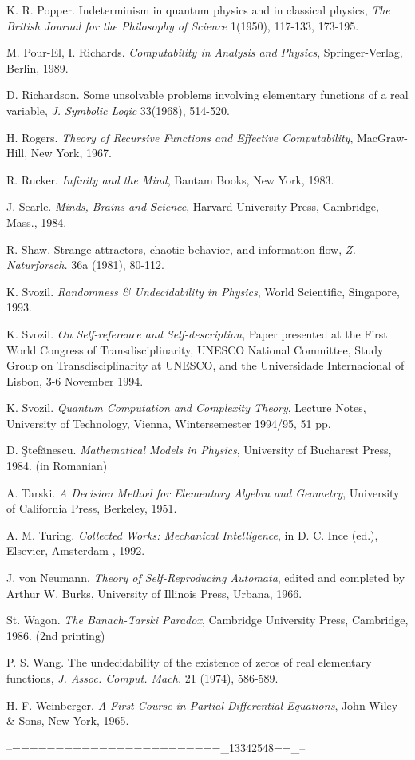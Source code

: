 \begin{thebibliography}{99999}
 K. R. Popper. Indeterminism in quantum physics and in classical
physics,
{\it The British Journal for the Philosophy of Science}
 1(1950), 117-133, 173-195.


 M. Pour-El, I. Richards. {\em
Computability in Analysis and Physics},
 Springer-Verlag, Berlin,  1989.

 D. Richardson. Some unsolvable problems involving
elementary functions
of a real variable, {\it J. Symbolic Logic} 33(1968), 514-520.

H. Rogers. {\it Theory of Recursive Functions and Effective
Computability}, MacGraw-Hill, New York, 1967.


R. Rucker. {\em Infinity and the Mind}, Bantam Books, New
York,  1983.


 J. Searle. {\it Minds, Brains and Science}, Harvard
University Press, Cambridge,
Mass., 1984.

  R. Shaw.  Strange attractors, chaotic behavior, and information
flow,
{\it Z. Naturforsch.}
36a
(1981),
80-112.


K. Svozil.  {\em Randomness \& Undecidability in Physics},
World
Scientific, Singapore,  1993.

K. Svozil. {\it On Self-reference and Self-description}, Paper
presented at the
First World Congress of Transdisciplinarity,
UNESCO National Committee,  Study Group on
Transdisciplinarity at UNESCO, and the Universidade Internacional of
Lisbon,
3-6 November 1994.

K. Svozil. {\it Quantum Computation and Complexity Theory}, Lecture Notes,
University of Technology, Vienna, Wintersemester 1994/95,  51 pp.

  D. \c Stef\u anescu. {\it Mathematical Models in Physics},
 University of Bucharest Press, 1984. (in Romanian)

 A. Tarski. {\it A Decision Method for Elementary Algebra
and Geometry}, University
of California Press, Berkeley, 1951.


 A. M. Turing. {\it Collected Works: Mechanical Intelligence},
in D. C. Ince (ed.),
Elsevier, Amsterdam , 1992.

 J. von Neumann.
 {\it Theory of Self-Reproducing Automata}, edited and completed by
                   Arthur W. Burks,
 University of Illinois Press, Urbana, 1966.


St. Wagon.  {\it The Banach-Tarski Paradox},
Cambridge University Press, Cambridge, 1986. (2nd printing)

  P. S. Wang. The undecidability of the existence of
zeros of real elementary functions, {\it J. Assoc. Comput. Mach.} 21
(1974), 586-589.

 H. F. Weinberger. {\it A First Course in Partial
Differential Equations}, John Wiley \& Sons, New York, 1965.


        \end{thebibliography}







--========================_13342548==_--

